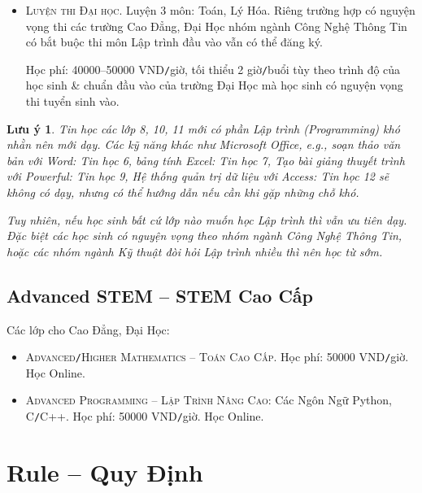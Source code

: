 \documentclass{article}
\numberwithin{equation}{section}
\newtheorem{luuy}{Lưu ý}
\begin{document}
\begin{itemize}
	{\sf Học phí:} 40000 VND{\tt/}giờ, tối thiểu 2 giờ{\tt/}buổi. Nếu học 2 giờ{\tt/}buổi, thì cứ 8 buổi học đóng $40000\cdot2\cdot8 = 640000$ VND, hoặc 10 buổi học đóng $40000\cdot2\cdot10 = 800000$ VND cho tiện.
	\item \textsc{Luyện thi Đại học.} Luyện 3 môn: Toán, Lý Hóa. Riêng trường hợp có nguyện vọng thi các trường Cao Đẳng, Đại Học nhóm ngành Công Nghệ Thông Tin có bắt buộc thi môn Lập trình đầu vào vẫn có thể đăng ký.
	
	{\sf Học phí:} 40000--50000 VND{\tt/}giờ, tối thiểu 2 giờ{\tt/}buổi tùy theo trình độ của học sinh \& chuẩn đầu vào của trường Đại Học mà học sinh có nguyện vọng thi tuyển sinh vào.
\end{itemize}

\begin{luuy}
	Tin học các lớp 8, 10, 11 mới có phần Lập trình (Programming) khó nhằn nên mới dạy. Các kỹ năng khác như Microsoft Office, e.g., soạn thảo văn bản với Word: Tin học 6, bảng tính Excel: Tin học 7, Tạo bài giảng thuyết trình với Powerful: Tin học 9, Hệ thống quản trị dữ liệu với Access: Tin học 12 sẽ không có dạy, nhưng có thể hướng dẫn nếu cần khi gặp những chỗ khó.
	
	Tuy nhiên, nếu học sinh bất cứ lớp nào muốn học Lập trình thì vẫn ưu tiên dạy. Đặc biệt các học sinh có nguyện vọng theo nhóm ngành Công Nghệ Thông Tin, hoặc các nhóm ngành Kỹ thuật đòi hỏi Lập trình nhiều thì nên học từ sớm.
\end{luuy}

\subsection{Advanced STEM -- STEM Cao Cấp}
Các lớp cho Cao Đẳng, Đại Học:
\begin{itemize}
	\item \textsc{Advanced{\tt/}Higher Mathematics -- Toán Cao Cấp}. {\sf Học phí:} 50000 VND{\tt/}giờ. Học Online.
	\item \textsc{Advanced Programming -- Lập Trình Nâng Cao}: Các Ngôn Ngữ Python, C{\tt/}C++. {\sf Học phí:} 50000 VND{\tt/}giờ. Học Online.
\end{itemize}


\section{Rule -- Quy Định}
\end{document}
